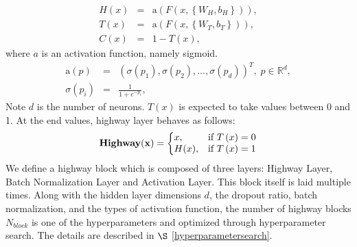 \documentclass[useamsfonts]{pasj01}
\begin{document}
\begin{eqnarray}
    H \left(x\right) &=& \mathrm{a} \left( F \left(x, \left\{W_H, b_H\right\}\right) \right), \\
    T \left(x\right) &=& \mathrm{a} \left( F \left(x, \left\{W_T, b_T\right\}\right) \right), \\
    C \left(x\right) &=& 1 - T \left(x\right),
\end{eqnarray}
where $a$ is an activation function, namely sigmoid.
\begin{eqnarray*}
    \mathrm{a} \left(p\right) &=& \left( \sigma\left(p_1\right),\sigma\left(p_2\right), \ldots, \sigma\left(p_d\right) \right)^T, \; p \in \mathbb{R}^d, \\
    \sigma \left(p_i\right) &=& \frac{1}{1 + e^{-p_i}},
\end{eqnarray*}
Note $d$ is the number of neurons.  $T(x)$ is expected to take values between 0 and 1.  At the end values, highway layer behaves as follows:
\begin{equation}
    {\bf Highway(x)}=\left\{
    \begin{array}{@{}ll@{}}
      x, & \text{if}\ T \left(x\right)=0 \\
      H(x), & \text{if} \ T \left(x\right)=1 
    \end{array}\right.
\end{equation}
We define a highway block which is composed of three layers: Highway Layer, Batch Normalization Layer and Activation Layer.
This block itself is laid multiple times.
Along with the hidden layer dimensions $d$, the dropout ratio, batch normalization, and the types of activation function, the number of highway blocks $N_{block}$ is one of the hyperparameters and optimized through hyperparameter search.   The details are described in $\S$ \ref{hyperparametersearch}.
\end{document}
